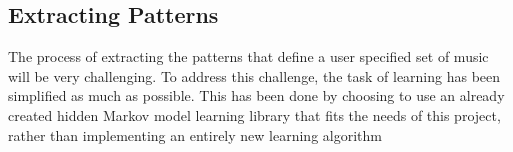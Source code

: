 \documentclass{article}
\begin{document}
\subsection{Extracting Patterns}
The process of extracting the patterns that define a user specified set of music will be very challenging. To address this challenge, the task of learning has been simplified as much as possible. This has been done by choosing to use an already created hidden Markov model learning library that fits the needs of this project, rather than implementing an entirely new learning algorithm

\nocite{*}





\end{document}
